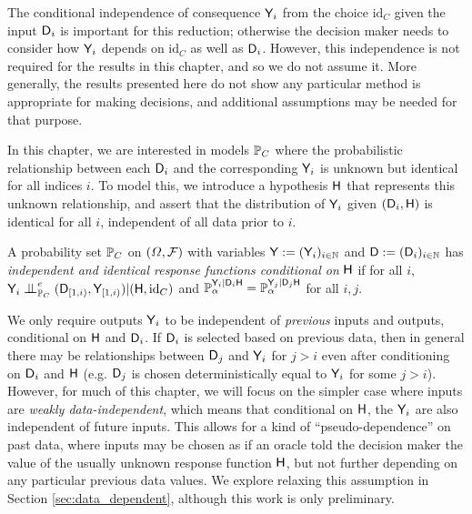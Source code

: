 The conditional independence of consequence $\mathsf{Y}_i$ from the choice $\text{id}_C$ given the input $\mathsf{D}_i$ is important for this reduction; otherwise the decision maker needs to consider how $\mathsf{Y}_i$ depends on $\text{id}_C$ as well as $\mathsf{D}_i$. However, this independence is not required for the results in this chapter, and so we do not assume it. More generally, the results presented here do not show any particular method is appropriate for making decisions, and additional assumptions may be needed for that purpose.

In this chapter, we are interested in models $\mathbb{P}_C$ where the probabilistic relationship between each $\mathsf{D}_i$ and the corresponding $\mathsf{Y}_i$ is unknown but identical for all indices $i$. To model this, we introduce a hypothesis $\mathsf{H}$ that represents this unknown relationship, and assert that the distribution of $\mathsf{Y}_i$ given $(\mathsf{D}_i,\mathsf{H})$ is identical for all $i$, independent of all data prior to $i$.

\begin{definition}\label{def:cii_rf}
A probability set $\mathbb{P}_C$ on $(\Omega,\mathcal{F})$ with variables $\mathsf{Y}:=(\mathsf{Y}_i)_{i\in \mathbb{N}}$ and $\mathsf{D}:=(\mathsf{D}_i)_{i\in\mathbb{N}}$ has \emph{independent and identical response functions conditional on} $\mathsf{H}$ if for all $i$, $\RV{Y}_i\CI^e_{\prob{P}_C} (\RV{D}_{[1,i)},\RV{Y}_{[1,i)})|(\RV{H},\text{id}_C)$ and $\mathbb{P}_\alpha^{\mathsf{Y}_i|\mathsf{D}_i\mathsf{H}}=\mathbb{P}_\alpha^{\mathsf{Y}_j|\mathsf{D}_j\mathsf{H}}$ for all $i,j$.
\end{definition}

We only require outputs $\mathsf{Y}_i$ to be independent of \emph{previous} inputs and outputs, conditional on $\mathsf{H}$ and $\mathsf{D}_i$. If $\mathsf{D}_i$ is selected based on previous data, then in general there may be relationships between $\mathsf{D}_j$ and $\mathsf{Y}_i$ for $j>i$ even after conditioning on $\mathsf{D}_i$ and $\mathsf{H}$ (e.g. $\mathsf{D}_j$ is chosen deterministically equal to $\mathsf{Y}_i$ for some $j>i$). However, for much of this chapter, we will focus on the simpler case where inputs are \emph{weakly data-independent}, which means that conditional on $\mathsf{H}$, the $\mathsf{Y}_i$ are also independent of future inputs. This allows for a kind of ``pseudo-dependence'' on past data, where inputs may be chosen as if an oracle told the decision maker the value of the usually unknown response function $\mathsf{H}$, but not further depending on any particular previous data values. We explore relaxing this assumption in Section \ref{sec:data_dependent}, although this work is only preliminary.

